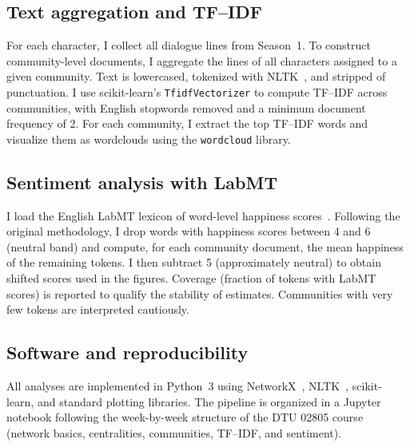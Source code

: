 \documentclass[9pt,twocolumn,twoside]{pnas-new}
\begin{document}
{\subsection*{Text aggregation and TF--IDF}

For each character, I collect all dialogue lines from Season~1. To construct community-level documents, I aggregate the lines of all characters assigned to a given community. Text is lowercased, tokenized with NLTK~\cite{bird2009}, and stripped of punctuation. I use scikit-learn’s \texttt{TfidfVectorizer} to compute TF--IDF across communities, with English stopwords removed and a minimum document frequency of 2. For each community, I extract the top TF--IDF words and visualize them as wordclouds using the \texttt{wordcloud} library.

\subsection*{Sentiment analysis with LabMT}

I load the English LabMT lexicon of word-level happiness scores~\cite{dodds2011}. Following the original methodology, I drop words with happiness scores between 4 and 6 (neutral band) and compute, for each community document, the mean happiness of the remaining tokens. I then subtract 5 (approximately neutral) to obtain shifted scores used in the figures. Coverage (fraction of tokens with LabMT scores) is reported to qualify the stability of estimates. Communities with very few tokens are interpreted cautiously.

\subsection*{Software and reproducibility}

All analyses are implemented in Python~3 using NetworkX~\cite{hagberg2008}, NLTK~\cite{bird2009}, scikit-learn, and standard plotting libraries. The pipeline is organized in a Jupyter notebook following the week-by-week structure of the DTU 02805 course (network basics, centralities, communities, TF--IDF, and sentiment).}

\showmatmethods{}


\end{document}
